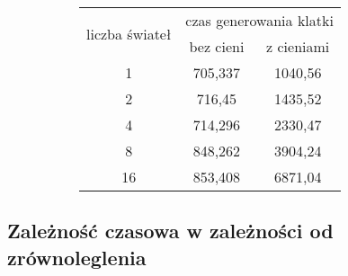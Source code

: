 \begin{figure}[!ht]
\advance\leftskip-2cm
\begin{subfigure}{.5\textwidth}
\end{subfigure}
\hspace{2cm}
\begin{subfigure}{.5\textwidth}
		\begin{longtable}{|c|c|c|} \hline
		\multirow{2}{*}{liczba świateł} & \multicolumn{2}{|c|}{czas generowania klatki} \\ \cline{2-3}
	    & bez cieni & z cieniami \\ \hline
	    1 & 705,337 & 1040,56 \\
	    2 & 716,45 & 1435,52 \\
		4 & 714,296 & 2330,47 \\
		8 & 848,262 & 3904,24 \\
		16 & 853,408 & 6871,04 \\
		\hline
		\end{longtable}
\end{subfigure}
\end{figure}


\subsection{Zależność czasowa w zależności od zrównoleglenia}

